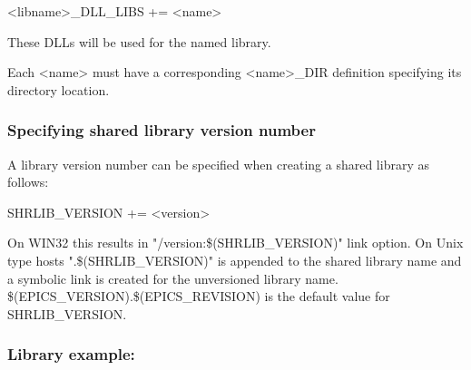 \begin{description}\item \textless{}libname\textgreater{}\_DLL\_LIBS += \textless{}name\textgreater{}

\end{description}These DLLs will be used for the named library.

Each \textless{}name\textgreater{} must have a corresponding \textless{}name\textgreater{}\_DIR definition specifying its directory location.

\subsubsection{Specifying shared library version number}

A library version number can be specified when creating a shared library as follows:

\begin{description}\item {}SHRLIB\_VERSION += \textless{}version\textgreater{}

\end{description}On WIN32 this results in "/version:\$(SHRLIB\_VERSION)" link option. On Unix type hosts ".\$(SHRLIB\_VERSION)" is 
appended to the shared library name and a symbolic link is created for the unversioned library name.  
\$(EPICS\_VERSION).\$(EPICS\_REVISION) is the default value for SHRLIB\_VERSION.

\subsubsection{Library example:}

